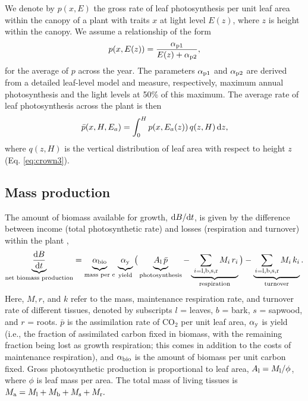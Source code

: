 \documentclass[10pt,twoside]{article}
\begin{document}
We denote by \(p(x, E)\) the gross rate of leaf photosynthesis per unit
leaf area within the canopy of a plant with traits \(x\) at light
level \(E(z)\), where \(z\) is height within the canopy.
We assume a relationship of the form
\begin{equation}\label{eq:photosynthesis}
p(x, E(z)) = \frac{\alpha_{{\rm p1}}}{E(z) + \alpha_{{\rm p2}}},
\end{equation}
for the average of \(p\) across the year. The parameters
\(\alpha_{{\rm p1}}\) and \(\alpha_{{\rm p2}}\) are derived from a detailed leaf-level
model and measure, respectively, maximum annual photosynthesis and the light levels at 50\% of this maximum. The average rate of
leaf photosynthesis across the plant is then
\begin{equation}\label{eq:photosynthesis_av}
\bar{p}(x, H, E_{a}) = \int_0^H p(x, E_a(z)) \, q(z, H) \, {\rm d}z,
\end{equation}
where \(q(z, H)\) is the vertical distribution of leaf area with respect to height \(z\) (Eq.
\ref{eq:crown3}).

\subsection{Mass production}\label{standard-model-for-mass-production}

The amount of biomass available for growth,
\({\rm d}B  / {\rm d}t\), is given by the difference between income
(total photosynthetic rate) and losses (respiration and turnover) within the
plant \citep{Makela-1997, Thornley-2000, Falster-2011},
\begin{equation}\label{eq:dbdt}
\underbrace{\strut \frac{{\rm d}B}{{\rm d}t}}_\textrm{net biomass production}
= \underbrace{\strut \alpha_{\rm bio} }_\textrm{mass per c} \,
\underbrace{\strut \alpha_{\rm y} }_\textrm{yield}
\big( \underbrace{\strut A_{\rm l} \, \bar{p}}_\textrm{photosynthesis} -
\underbrace{\strut \, \sum_{i = {\rm l}, {\rm b}, {\rm s}, {\rm r}}{M_i \, r_i}}_\textrm{respiration}\big)
- \underbrace{\strut \sum_{i = {\rm l}, {\rm b}, {\rm s},  {\rm r}}{M_i \, k_i}}_\textrm{turnover}.
\end{equation}
Here, \(M, r\), and \(k\) refer to the mass, maintenance respiration rate, and
turnover rate of different tissues, denoted by subscripts \(l\) = leaves,
\(b\) = bark, \(s\) = sapwood, and \(r\) = roots. \(\bar{p}\) is the assimilation
rate of CO\(_2\) per unit leaf area, \(\alpha_{\rm y}\) is yield (i.e., the fraction of
assimilated carbon fixed in biomass, with the remaining fraction being lost
as growth respiration; this comes in addition
to the costs of maintenance respiration), and \(\alpha_{\rm bio}\) is the amount of biomass per unit carbon fixed. Gross photosynthetic production is proportional to leaf area,
\(A_{\rm l} = M_{\rm l} / \phi\), where \(\phi\) is leaf mass per
area. The total mass of living tissues is
\(M_{\rm a} = M_{\rm l} + M_{\rm b} + M_{\rm s} + M_{\rm r}.\)
\end{document}
